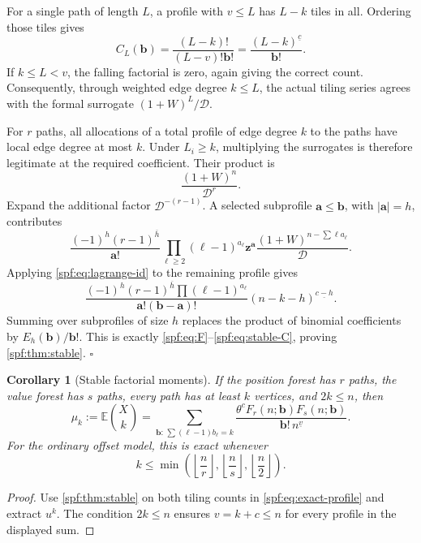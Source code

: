 \documentclass[11pt]{article}
\numberwithin{equation}{section}
\newtheorem{corollary}[theorem]{Corollary}
\theoremstyle{definition}
\theoremstyle{remark}
\theoremstyle{definition}
\newcommand{\E}{\mathbb E}
\newcommand{\fall}[2]{{#1}^{\underline{#2}}}
\newcommand{\rise}[2]{{#1}^{\overline{#2}}}
\newcommand{\bfac}{\mathbf b!}
\begin{document}
For a single path of length $L$, a profile with $v\le L$ has $L-k$ tiles in
all. Ordering those tiles gives
\begin{equation}
 C_L(\mathbf b)=\frac{(L-k)!}{(L-v)!\bfac}
              =\frac{\fall{(L-k)}c}{\bfac}.
 \label{spf:eq:onepath}
\end{equation}
If $k\le L<v$, the falling factorial is zero, again giving the correct count.
Consequently, through weighted edge degree $k\le L$, the actual tiling series
agrees with the formal surrogate $(1+W)^L/\mathcal D$.

For $r$ paths, all allocations of a total profile of edge degree $k$ to the
paths have local edge degree at most $k$. Under $L_i\ge k$, multiplying the
surrogates is therefore legitimate at the required coefficient. Their product
is
\begin{equation}
 \frac{(1+W)^n}{\mathcal D^r}.
 \label{spf:eq:forest-surrogate}
\end{equation}
Expand the additional factor $\mathcal D^{-(r-1)}$. A selected subprofile
$\mathbf a\le\mathbf b$, with $|\mathbf a|=h$, contributes
\begin{equation}
 \frac{(-1)^h\rise{(r-1)}h}{\mathbf a!}
 \prod_{\ell\ge2}(\ell-1)^{a_\ell}\mathbf z^{\mathbf a}
 \frac{(1+W)^{n-\sum\ell a_\ell}}{\mathcal D}.
\end{equation}
Applying \eqref{spf:eq:lagrange-id} to the remaining profile gives
\begin{equation}
 \frac{(-1)^h\rise{(r-1)}h
          \prod(\ell-1)^{a_\ell}}{\mathbf a!(\mathbf b-\mathbf a)!}
 \fall{(n-k-h)}{c-h}.
\end{equation}
Summing over subprofiles of size $h$ replaces the product of binomial
coefficients by $E_h(\mathbf b)/\bfac$. This is exactly
\eqref{spf:eq:F}--\eqref{spf:eq:stable-C}, proving \cref{spf:thm:stable}.
\hfill$\square$

\begin{corollary}[Stable factorial moments]
\label{spf:cor:stable-moments}
If the position forest has $r$ paths, the value forest has $s$ paths, every
path has at least $k$ vertices, and $2k\le n$, then
\begin{equation}
 \mu_k:=\E\binom Xk
 =\sum_{\mathbf b:\,\sum(\ell-1)b_\ell=k}
       \frac{\theta^c F_r(n;\mathbf b)F_s(n;\mathbf b)}
            {\bfac\,\fall nv}.
 \label{spf:eq:stable-moment}
\end{equation}
For the ordinary offset model, this is exact whenever
\begin{equation}
 k\le\min\left(\left\lfloor\frac nr\right\rfloor,
               \left\lfloor\frac ns\right\rfloor,
               \left\lfloor\frac n2\right\rfloor\right).
 \label{spf:eq:stable-range}
\end{equation}
\end{corollary}
\begin{proof}
Use \cref{spf:thm:stable} on both tiling counts in \eqref{spf:eq:exact-profile} and
extract $u^k$. The condition $2k\le n$ ensures $v=k+c\le n$ for every profile
in the displayed sum.
\end{proof}
\end{document}
